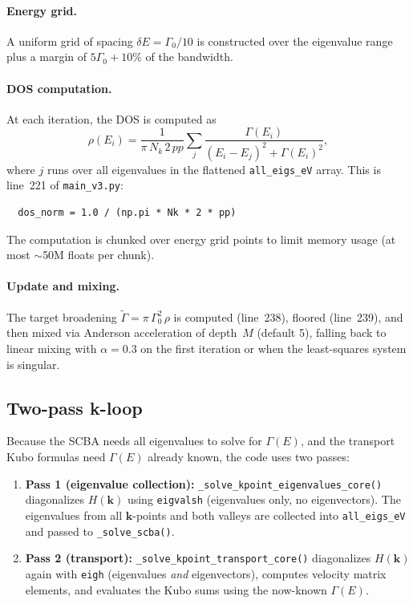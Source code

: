 \documentclass[11pt]{article}
\newcommand{\Gam}{\Gamma}
\newcommand{\Nk}{N_k}
\begin{document}
\paragraph{Energy grid.}  A uniform grid of spacing
$\delta E = \Gam_0/10$ is constructed over the eigenvalue range plus a
margin of $5\Gam_0 + 10\%$ of the bandwidth.

\paragraph{DOS computation.}  At each iteration, the DOS is computed as
\begin{equation}
  \rho(E_i) = \frac{1}{\pi\,\Nk\, 2\,pp}
  \sum_{j} \frac{\Gam(E_i)}{(E_i - E_j)^2 + \Gam(E_i)^2},
\end{equation}
where $j$ runs over all eigenvalues in the flattened
\texttt{all\_eigs\_eV} array.  This is line~221 of \texttt{main\_v3.py}:
\begin{verbatim}
  dos_norm = 1.0 / (np.pi * Nk * 2 * pp)
\end{verbatim}
The computation is chunked over energy grid points to limit memory
usage (at most $\sim$50M floats per chunk).

\paragraph{Update and mixing.}  The target broadening
$\widetilde{\Gam} = \pi\,\Gam_0^2\,\rho$ is computed (line~238),
floored (line~239), and then mixed via Anderson acceleration of
depth~$M$ (default 5), falling back to linear mixing with
$\alpha = 0.3$ on the first iteration or when the least-squares system
is singular.

\subsection{Two-pass k-loop}

Because the SCBA needs all eigenvalues to solve for $\Gam(E)$, and
the transport Kubo formulas need $\Gam(E)$ already known, the code
uses two passes:

\begin{enumerate}
  \item \textbf{Pass 1 (eigenvalue collection):}
    \texttt{\_solve\_kpoint\_eigenvalues\_core()} diagonalizes $H(\mathbf{k})$
    using \texttt{eigvalsh} (eigenvalues only, no eigenvectors).
    The eigenvalues from all $\mathbf{k}$-points and both valleys are
    collected into \texttt{all\_eigs\_eV} and passed to
    \texttt{\_solve\_scba()}.

  \item \textbf{Pass 2 (transport):}
    \texttt{\_solve\_kpoint\_transport\_core()} diagonalizes
    $H(\mathbf{k})$ again with \texttt{eigh} (eigenvalues \emph{and}
    eigenvectors), computes velocity matrix elements, and evaluates the
    Kubo sums using the now-known $\Gam(E)$.
\end{enumerate}
\end{document}
